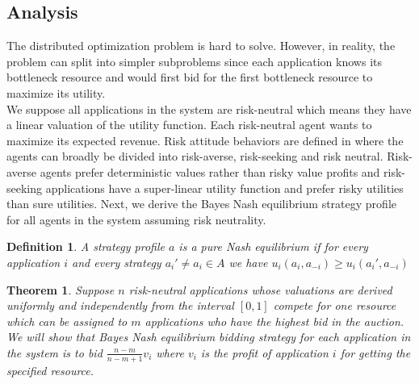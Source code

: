 \subsection{Analysis}
The distributed optimization problem is hard to solve. However, in reality, the problem can split into simpler subproblems since each application knows its bottleneck resource and would first bid for the first bottleneck resource to maximize its utility.\\
\indent We suppose all applications in the system are risk-neutral which means they have a linear valuation of the utility function. Each risk-neutral agent wants to maximize its expected revenue. Risk attitude behaviors are defined in \cite{ferber1999multi} where the agents can broadly be divided into risk-averse, risk-seeking and risk neutral. Risk-averse agents prefer deterministic values rather than risky value profits and risk-seeking applications have a super-linear utility function and prefer risky utilities than sure utilities. Next, we derive the Bayes Nash equilibrium strategy profile for all agents in the system assuming risk neutrality. 
\newtheorem{defi}{Definition}
\begin{defi}
A strategy profile $a$ is a pure Nash equilibrium if for every application $i$ and every strategy $a_i' \neq a_i \in A$ we have $u_i(a_i, a_{-i}) \geq u_i(a_i', a_{-i})$
\end{defi}
\newtheorem{theorem}{Theorem}
\begin{theorem}\label{thm:neat}
\label{Auction}
Suppose $n$ risk-neutral applications whose valuations are derived uniformly and independently from the interval $[0,1]$ compete for one resource which can be assigned to $m$ applications who have the highest bid in the auction. We will show that Bayes Nash equilibrium bidding strategy for each application in the system is to bid $\frac{n-m}{n-m+1}v_i$ where $v_i$ is the profit of application $i$ for getting the specified resource.  
\end{theorem}
